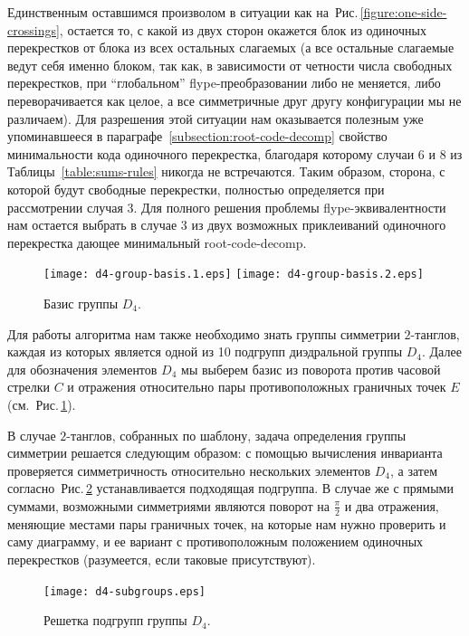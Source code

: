 \documentclass[12pt]{article}
\theoremstyle{plain}
\theoremstyle{definition}
\def\figureref#1{Рис.\,\protect\ref{#1}}
\def\RCD{\hbox{root-code-decomp}}
\begin{document}
		Единственным оставшимся произволом в ситуации как на~\figureref{figure:one-side-crossings}, остается то, с какой из двух
		сторон окажется блок из одиночных перекрестков от блока из всех остальных слагаемых (а все остальные слагаемые ведут себя
		именно блоком, так как, в зависимости от четности числа свободных перекрестков, при ``глобальном'' flype-преобразовании
		либо не меняется, либо переворачивается как целое, а все симметричные друг другу конфигурации мы не различаем). Для
		разрешения этой ситуации нам оказывается полезным уже упоминавшееся в параграфе~\ref{subsection:root-code-decomp}
		свойство минимальности кода одиночного перекрестка, благодаря которому случаи 6 и 8 из Таблицы~\ref{table:sums-rules}
		никогда не встречаются. Таким образом, сторона, с которой будут свободные перекрестки, полностью определяется при
		рассмотрении случая 3. Для полного решения проблемы flype-эквивалентности нам остается выбрать в случае 3 из двух возможных
		приклеиваний одиночного перекрестка дающее минимальный \RCD{}.

		\begin{figure}[ht]
			\centering
			\texttt{[image: d4-group-basis.1.eps]}
			\qquad
			\texttt{[image: d4-group-basis.2.eps]}
			\caption{\footnotesize Базис группы $D_4$.\label{figure:d4-group-basis}}
		\end{figure}

		Для работы алгоритма нам также необходимо знать группы симметрии $2$-танглов, каждая из которых является одной из 10
		подгрупп диэдральной группы $D_4$. Далее для обозначения элементов $D_4$ мы выберем базис из поворота против часовой
		стрелки $C$ и отражения относительно пары противоположных граничных точек $E$ (см.~\figureref{figure:d4-group-basis}).

		В случае $2$-танглов, собранных по шаблону, задача определения группы симметрии решается следующим образом: с помощью
		вычисления инварианта проверяется симметричность относительно нескольких элементов $D_4$, а затем
		согласно~\figureref{figure:D4-subgroups} устанавливается подходящая подгруппа. В случае же с прямыми суммами, возможными
		симметриями являются поворот на $\frac{\pi}{2}$ и два отражения, меняющие местами пары граничных точек, на которые нам
		нужно проверить и саму диаграмму, и ее вариант с противоположным положением одиночных перекрестков (разумеется, если
		таковые присутствуют).

		\begin{figure}[ht]
			\centering
			\texttt{[image: d4-subgroups.eps]}
			\caption{\footnotesize Решетка подгрупп группы $D_4$.\label{figure:D4-subgroups}}
		\end{figure}
\end{document}
